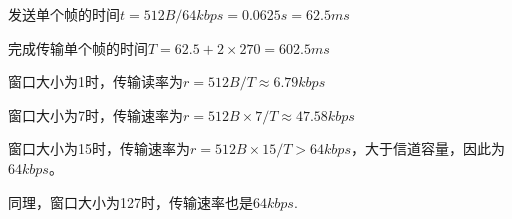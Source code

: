\documentclass{ctexart}
\begin{document}
\begin{itemize}
    发送单个帧的时间$t = 512B / 64kbps = 0.0625s = 62.5 ms$

    完成传输单个帧的时间$T = 62.5 + 2 \times 270 = 602.5 ms$

    窗口大小为1时，传输读率为$r = 512B / T \approx 6.79 kbps$

    窗口大小为7时，传输速率为$r = 512B \times 7 / T \approx 47.58 kbps$

    窗口大小为15时，传输速率为$r = 512B \times 15 / T > 64kbps$，大于信道容量，因此为$64kbps$。
    
    同理，窗口大小为127时，传输速率也是$64kbps$.
\end{itemize}
\end{document}
